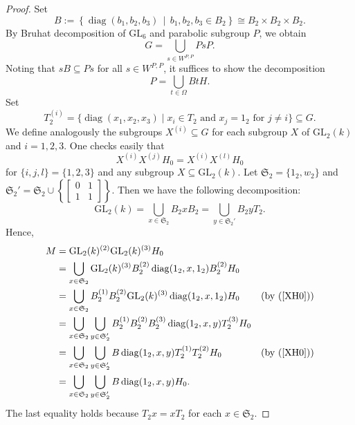 \documentclass[12pt]{amsart}
\newcommand{\GL}{{\mathrm{GL}}}
\newcommand{\diag}{\operatorname{diag}}
\theoremstyle{Theorem}
\theoremstyle{Theorem}
\theoremstyle{Theorem}
\theoremstyle{Theorem}
\theoremstyle{Plain}
\theoremstyle{remark}
\theoremstyle{remark}
\theoremstyle{Definition}
\begin{document}
\begin{proof}
    Set
    \[
        B := \left\{ \diag( b_1, b_2, b_3 ) \, \middle| \, b_1, b_2, b_3 \in B_2 \right\} \cong B_2 \times B_2 \times B_2.
    \]
    By Bruhat decomposition of $\GL_6$ and parabolic subgroup $P$, we obtain
    \[
        G = \bigcup_{ s \in W^{P, P} } PsP.
    \]
    Noting that $ sB \subseteq Ps $ for all $ s \in W^{P, P} $, it suffices to show the decomposition
    \[
        P = \bigcup_{ t \in \Omega } BtH.
    \]
    Set
    \[
        T_2^{(i)} = \{ \diag( x_1, x_2, x_3 ) \mid x_i \in T_2 \text{ and } x_j = 1_2 \text{ for } j \ne i \} \subseteq G.
    \]
    We define analogously the subgroups $ X^{(i)} \subseteq G $ for each subgroup $X$ of $\GL_2(k)$ and $ i = 1, 2, 3 $. One checks easily that 
    \begin{equation}
        \label{XH0}
        X^{(i)} X^{(j)} H_0 = X^{(i)} X^{(l)} H_0
    \end{equation}
    for $ \{ i, j, l \} = \{ 1, 2, 3 \} $ and any subgroup $ X \subseteq \GL_2(k) $. Let $ \mathfrak{S}_2 = \{ 1_2, w_2 \} $ and $ \mathfrak{S}_2' = \mathfrak{S}_2 \cup \left\{
    \begin{bmatrix}
        0 & 1\\
        1 & 1
    \end{bmatrix}
    \right\} $. Then we have the following decomposition:
    \[
        \GL_2(k) = \bigcup_{ x \in \mathfrak{S}_2 } B_2 x B_2 = \bigcup_{ y \in \mathfrak{S}_2' } B_2 y T_2.
    \]
    Hence,
    \[
        \begin{aligned}
            M &= \GL_2(k)^{(2)} \GL_2(k)^{(3)} H_0                              \\
              &= \bigcup_{ x \in \mathfrak{S}_2 } \GL_2(k)^{(3)} B_2^{(2)} \diag( 1_2, x, 1_2 ) B_2^{(2)} H_0                                                     \\
              &= \bigcup_{ x \in \mathfrak{S}_2 } B_2^{(1)} B_2^{(2)} \GL_2(k)^{(3)} \diag( 1_2, x, 1_2 ) H_0                   & ( \text{by } ( \ref{XH0} ) )\\
              &= \bigcup_{ x \in \mathfrak{S}_2 } \bigcup_{ y \in \mathfrak{S}_2' } B_2^{(1)} B_2^{(2)} B_2^{(3) } \diag( 1_2, x, y ) T_2^{(3)} H_0             \\
              &= \bigcup_{ x \in \mathfrak{S}_2 } \bigcup_{ y \in \mathfrak{S}_2' } B \diag( 1_2, x, y ) T_2^{(1)} T_2^{(2)} H_0 & ( \text{by } ( \ref{XH0} ) )\\
              &= \bigcup_{ x \in \mathfrak{S}_2 } \bigcup_{ y \in \mathfrak{S}_2' } B \diag( 1_2, x, y ) H_0.
            \end{aligned}
    \]
    The last equality holds because $ T_2 x = x T_2 $ for each $ x \in \mathfrak{S}_2 $. 
    

\end{proof}
\end{document}

